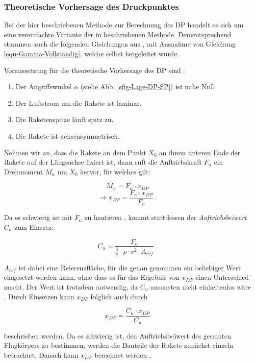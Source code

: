 \documentclass[10pt,a4paper]{article}
\begin{document}
\subsubsection{Theoretische Vorhersage des Druckpunktes}

\label{Theorie-Stabi-Sec}
Bei der hier beschriebenen Methode zur Berechnung des DP handelt es sich um eine vereinfachte Variante der in \cite{sn} beschriebenen Methode. Dementsprechend stammen auch die folgenden Gleichungen aus \cite{sn}, mit Ausnahme von Gleichung \eqref{equ-Gamma-Vollständig}, welche selbst hergeleitet wurde.
\medskip

\noindent
Voraussetzung für die theoretische Vorhersage des DP sind \cite{sn}:
\begin{enumerate}
	\item Der Angriffswinkel $ \alpha $ (siehe Abb. \ref{sfig-Lage-DP-SP}) ist nahe Null.
	\item Der Luftstrom um die Rakete ist laminar.
	\item Die Raketenspitze läuft spitz zu.
	\item Die Rakete ist achsensymmetrisch.
\end{enumerate}

\noindent
Nehmen wir an, dass die Rakete an dem Punkt $X_{0}$ an ihrem unteren Ende der Rakete auf der Längsachse fixiert ist, dann ruft die Auftriebskraft $F_{n}$ ein Drehmoment $M_{n}$ um $X_{0}$ hervor, für welches gilt:

\[ M_{n} = F_{n} \cdot x_{DP} \]
\[ \Rightarrow x_{DP} = \frac{F_{n} \cdot x_{DP}}  {F_{n}} \ . \]

\noindent
Da es schwierig ist mit $F_{n}$ zu hantieren \cite{sn}, kommt stattdessen der \textit{Auftriebsbeiwert} $C_{n}$ zum Einsatz:

\[ C_{n} = \dfrac{F_{n}}{\tfrac{1}{2} \cdot \rho \cdot v^{2} \cdot A_{ref}} \ . \]

\noindent
$A_{ref}$ ist dabei eine Referenzfläche, für die genau genommen ein beliebiger Wert eingesetzt werden kann, ohne dass es für das Ergebnis von $x_{DP}$ einen Unterschied macht. Der Wert ist trotzdem notwendig, da $C_{n}$ ansonsten nicht einheitenlos wäre \cite{sn}.
Durch Einsetzen kann $x_{DP}$ folglich auch durch

\[ x_{DP} = \frac{C_{n} \cdot x_{DP}}{C_{n}}  \]

\noindent
beschrieben werden. Da es schwierig ist, den Auftriebsbeiwert des gesamten Flugkörpers zu bestimmen, werden die Bauteile der Rakete zunächst einzeln betrachtet. Danach kann $x_{DP}$  berechnet werden \cite{AbR,sn},
\end{document}
